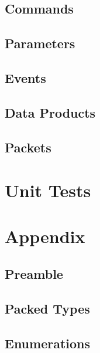 \subsection{Commands}



\subsection{Parameters}



\subsection{Events}



\subsection{Data Products}



\subsection{Packets}



\section{Unit Tests}



\section{Appendix}

\subsection{Preamble}



\subsection{Packed Types}



\subsection{Enumerations}




